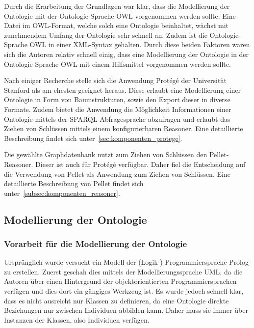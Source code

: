 Durch die Erarbeitung der Grundlagen war klar, dass die Modellierung der Ontologie mit der Ontologie-Sprache OWL vorgenommen werden sollte. Eine Datei im OWL-Format, welche solch eine Ontologie beinhaltet, wächst mit zunehmendem Umfang der Ontologie sehr schnell an. Zudem ist die Ontologie-Sprache OWL in einer XML-Syntax gehalten. Durch diese beiden Faktoren waren sich die Autoren relativ schnell einig, dass eine Modellierung der Ontologie in der Ontologie-Sprache OWL mit einem Hilfsmittel vorgenommen werden sollte.

Nach einiger Recherche stelle sich die Anwendung Protégé der Universität Stanford als am ehesten geeignet heraus. Diese erlaubt eine Modellierung einer Ontologie in Form von Baumstrukturen, sowie den Export dieser in diverse Formate. Zudem bietet die Anwendung die Möglichkeit Informationen einer Ontologie mittels der SPARQL-Abfragesprache abzufragen und erlaubt das Ziehen von Schlüssen mittels einem konfigurierbaren Reasoner. Eine detaillierte Beschreibung findet sich unter~\autoref{sec:komponenten_protege}.

Die gewählte Graphdatenbank nutzt zum Ziehen von Schlüssen den Pellet-Reasoner. Dieser ist auch für Protégé verfügbar. Daher fiel die Entscheidung auf die Verwendung von Pellet als Anwendung zum Ziehen von Schlüssen. Eine detaillierte Beschreibung von Pellet findet sich unter~\autoref{subsec:komponenten_reasoner}.


\newpage

\subsection{Modellierung der Ontologie}
\label{sub:modellierung_der_ontologie}

\subsubsection{Vorarbeit für die Modellierung der Ontologie}
\label{sub:modellierung_der_ontologie_vorarbeit}
Ursprünglich wurde versucht ein Modell der (Logik-) Programmiersprache Prolog zu erstellen. Zuerst geschah dies mittels der Modellierungssprache UML, da die Autoren über einen Hintergrund der objektorientierten Programmiersprachen verfügen und dies dort ein gängiges Werkzeug ist. Es wurde jedoch schnell klar, dass es nicht ausreicht nur Klassen zu definieren, da eine Ontologie direkte Beziehungen nur zwischen Individuen abbilden kann. Daher muss sie immer über Instanzen der Klassen, also Individuen verfügen.

